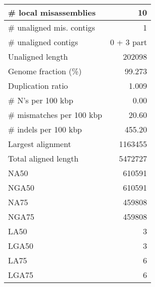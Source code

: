 \documentclass[12pt,a4paper]{article}
\begin{document}
\begin{table}[ht]
\begin{center}
\begin{tabular}{|l*{1}{|r}|}
\# local misassemblies & 10 \\ \hline
\# unaligned mis. contigs & 1 \\ \hline
\# unaligned contigs & 0 + 3 part \\ \hline
Unaligned length & 202098 \\ \hline
Genome fraction (\%) & 99.273 \\ \hline
Duplication ratio & 1.009 \\ \hline
\# N's per 100 kbp & 0.00 \\ \hline
\# mismatches per 100 kbp & 20.60 \\ \hline
\# indels per 100 kbp & 455.20 \\ \hline
Largest alignment & 1163455 \\ \hline
Total aligned length & 5472727 \\ \hline
NA50 & 610591 \\ \hline
NGA50 & 610591 \\ \hline
NA75 & 459808 \\ \hline
NGA75 & 459808 \\ \hline
LA50 & 3 \\ \hline
LGA50 & 3 \\ \hline
LA75 & 6 \\ \hline
LGA75 & 6 \\ \hline
\end{tabular}
\end{center}
\end{table}
\end{document}

